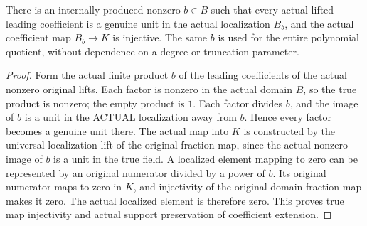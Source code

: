 \begin{theorem}
\label{hir:relative-normal-uniform-common-denominator}
\leanok
{}
There is an internally produced nonzero $b\in B$ such that every actual lifted
leading coefficient is a genuine unit in the actual localization $B_b$, and
the actual coefficient map $B_b\longrightarrow K$ is injective. The same $b$
is used for the entire polynomial quotient, without dependence on a degree
or truncation parameter.
\end{theorem}
\begin{proof}
Form the actual finite product $b$ of the leading coefficients of the actual
nonzero original lifts. Each factor is nonzero in the actual domain $B$, so
the true product is nonzero; the empty product is $1$. Each factor divides
$b$, and the image of $b$ is a unit in the ACTUAL localization away from $b$.
Hence every factor becomes a genuine unit there. The actual map into $K$
is constructed by the universal localization lift of the original fraction
map, since the actual nonzero image of $b$ is a unit in the true field.
A localized element mapping to zero can be represented by an original
numerator divided by a power of $b$. Its original numerator maps to zero in
$K$, and injectivity of the original domain fraction map makes it zero.
The actual localized element is therefore zero. This proves true map
injectivity and actual support preservation of coefficient extension.
\end{proof}

